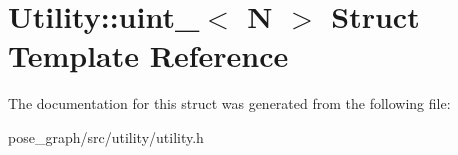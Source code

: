 \hypertarget{structUtility_1_1uint__}{}\section{Utility\+:\+:uint\+\_\+$<$ N $>$ Struct Template Reference}
\label{structUtility_1_1uint__}


The documentation for this struct was generated from the following file\+:\begin{DoxyCompactItemize}
\item 
pose\+\_\+graph/src/utility/utility.\+h\end{DoxyCompactItemize}
